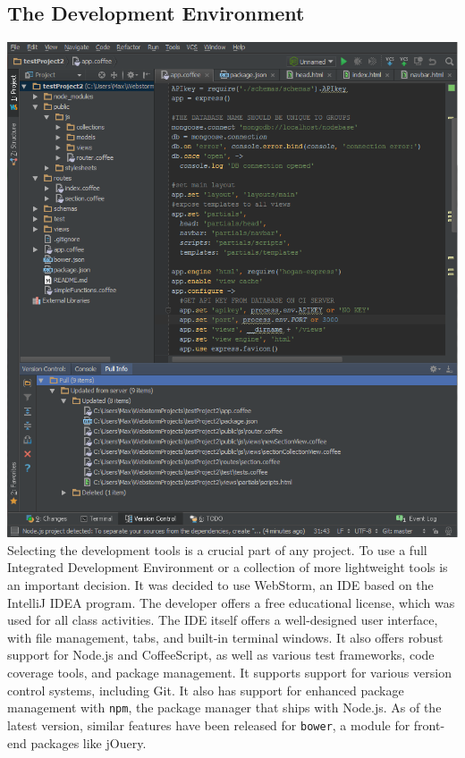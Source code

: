 \documentclass[12pt]{article}
\newcommand{\comment}[1]{{\bf \tt  {#1}}}
\newcommand{\emcomment}[1]{\textcolor{ForestGreen}{\comment{Elena: {#1}}}}
\newcommand{\code}[1]{{\texttt {#1}}}
\begin{document}
\subsection{The Development Environment}\label{sec:IDE}
\includegraphics[width=\linewidth]{img/webstorm.png}
Selecting the development tools is a crucial part of any project. To use a full Integrated Development Environment or a collection of more lightweight tools is an important decision. It was decided to use WebStorm, an IDE based on the IntelliJ IDEA program. The developer offers a free educational license, which was used for all class activities. The IDE itself offers a well-designed user interface, with file management, tabs, and built-in terminal windows. It also offers robust support for Node.js and CoffeeScript, as well as various test frameworks, code coverage tools, and package management. It supports support for various version control systems, including Git. It also has support for enhanced package management with \code{npm}, the package manager that ships with Node.js. As of the latest version, similar features have been released for \code{bower}, a module for front-end packages like jOuery.
\end{document}
